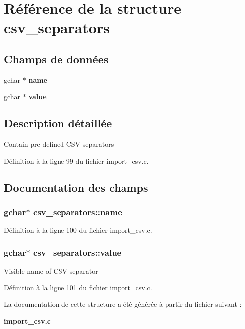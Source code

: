 \section{Référence de la structure csv\_\-separators}
\label{structcsv__separators}
\subsection*{Champs de données}
\begin{DoxyCompactItemize}
\item 
gchar $\ast$ {\bf name}
\item 
gchar $\ast$ {\bf value}
\end{DoxyCompactItemize}


\subsection{Description détaillée}
Contain pre-\/defined CSV separators 

Définition à la ligne 99 du fichier import\_\-csv.c.



\subsection{Documentation des champs}
\subsubsection[{name}]{\setlength{\rightskip}{0pt plus 5cm}gchar$\ast$ {\bf csv\_\-separators::name}}\label{structcsv__separators_ae8b00af46501b68115d419da93e1034b}


Définition à la ligne 100 du fichier import\_\-csv.c.

\subsubsection[{value}]{\setlength{\rightskip}{0pt plus 5cm}gchar$\ast$ {\bf csv\_\-separators::value}}\label{structcsv__separators_a877faa52231fdd8712b3b1af897740cc}
Visible name of CSV separator 

Définition à la ligne 101 du fichier import\_\-csv.c.



La documentation de cette structure a été générée à partir du fichier suivant :\begin{DoxyCompactItemize}
\item 
{\bf import\_\-csv.c}\end{DoxyCompactItemize}
